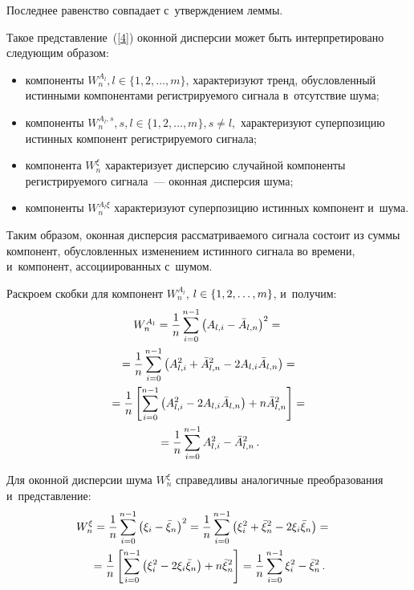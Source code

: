 \begin{multicols}{2}
Последнее равенство совпадает с~утверждением леммы.

Такое представление~(\ref{4}) оконной дисперсии может быть интерпретировано 
следующим образом:
\begin{itemize}
    \item
    компоненты $W_n^{A_l}, l \in \{ 1, 2, \ldots, m\} $, характеризуют тренд, 
    обусловленный истинными компонентами регистрируемого сигнала в~отсутствие шума;
    \item
    компоненты $W_n^{A_l,s}, s, l \in \{ 1, 2, \ldots, m\}, s\neq l, $ характеризуют 
    суперпозицию истинных компонент регистрируемого сигнала;
    \item
    компонента $W_n^{\xi}$  характеризует дисперсию случайной компоненты 
    регистрируемого сигнала~--- оконная дисперсия шума;
    \item
    компоненты $W_n^{A_l\xi}$ характеризуют суперпозицию истинных компонент и~шума.
\end{itemize}

Таким образом, оконная дисперсия рассматриваемого сигнала состоит 
из суммы компонент, обусловленных изменением истинного сигнала во времени,
 и~компонент, ассоциированных с~шумом.

Раскроем скобки для компонент $W_n^{A_l}$, $l \hm\in \{ 1, 2, \ldots, m\} $, 
и~получим:
\begin{multline*}$$
W_n^{A_l} = \fr{1}{n}\sum\limits_{i=0}^{n-1}\left( A_{l,i} - \bar{A}_{l,n}\right)^{2} 
= {}\\
{}=\fr{1}{n}\sum\limits_{i=0}^{n-1}\left( A_{l,i}^{2} + \bar{A}_{l,n}^{2} - 
2A_{l,i}\bar{A}_{l,n}\right) ={}
\\
{}= \fr{1}{n}\left[ \sum\limits_{i=0}^{n-1}\left( A_{l,i}^{2} - 2A_{l,i}\bar{A}_{l,n} 
\right) + n\bar{A}_{l,n}^{2} \right] = {}\\
{}=
\fr{1}{n} \sum\limits_{i=0}^{n-1}A_{l,i}^{2} - \bar{A}_{l,n}^{2}\,.
\end{multline*}

Для оконной дисперсии шума $W_n^{\xi}$ справедливы аналогичные 
преобразования и~представление:
\begin{multline*}
\hspace*{-7pt}W_n^{\xi} = \displaystyle\frac{\displaystyle 1\mathstrut}{\displaystyle n\mathstrut}\sum\limits_{i=0}^{n-1}\left( \xi_{i} - \bar{\xi}_{n}\right)^{2} = \frac{1}{n}\sum\limits_{i=0}^{n-1}
\left( \xi_{i}^{2} + \bar{\xi}_{n}^{2} - 2\xi_{i}\bar{\xi}_{n}\right) ={}
\\
{}= \displaystyle\frac{\displaystyle 1\mathstrut}{\displaystyle n\mathstrut}\left[ \sum\limits_{i=0}^{n-1}\left( \xi_{i}^{2} -
 2\xi_{i}\bar{\xi}_{n} \right) + n\bar{\xi}_{n}^{2} \right] = 
 \displaystyle\frac{\displaystyle 1\mathstrut}{\displaystyle n\mathstrut} \sum\limits_{i=0}^{n-1}\xi_{i}^{2} - \bar{\xi}_{n}^{2}\,.
\end{multline*}



\end{multicols}
